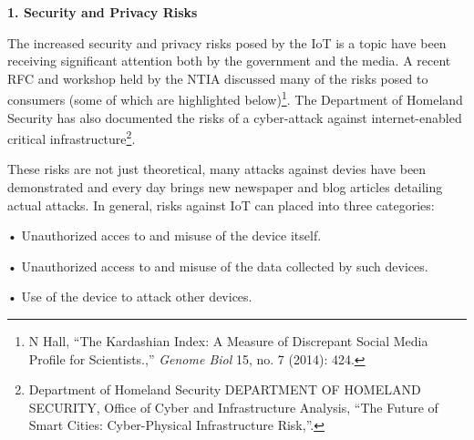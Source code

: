 \textbf{1. Security and Privacy Risks}

The increased security and privacy risks posed by the IoT is a topic
have been receiving significant attention both by the government and the
media. A recent RFC and workshop held by the NTIA discussed many of the
risks posed to consumers (some of which are highlighted below)\footnote{N
  Hall, ``The Kardashian Index: A Measure of Discrepant Social Media
  Profile for Scientists.,'' \emph{Genome Biol} 15, no. 7 (2014): 424.}.
The Department of Homeland Security has also documented the risks of a
cyber-attack against internet-enabled critical infrastructure\footnote{Department
  of Homeland Security DEPARTMENT OF HOMELAND SECURITY, Office of Cyber
  and Infrastructure Analysis, ``The Future of Smart Cities:
  Cyber-Physical Infrastructure Risk,''.}.

These risks are not just theoretical, many attacks against devies have
been demonstrated and every day brings new newspaper and blog articles
detailing actual attacks. In general, risks against IoT can placed into
three categories:

• Unauthorized acces to and misuse of the device itself.

• Unauthorized access to and misuse of the data collected by such
devices.

• Use of the device to attack other devices.